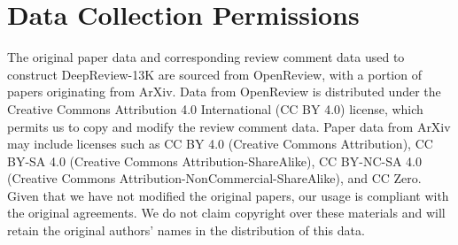 \documentclass{article}
\begin{document}


\section{Data Collection Permissions}
\label{appendix:pipline}
The original paper data and corresponding review comment data used to construct DeepReview-13K are sourced from OpenReview, with a portion of papers originating from ArXiv. Data from OpenReview is distributed under the Creative Commons Attribution 4.0 International (CC BY 4.0) license, which permits us to copy and modify the review comment data. Paper data from ArXiv may include licenses such as CC BY 4.0 (Creative Commons Attribution), CC BY-SA 4.0 (Creative Commons Attribution-ShareAlike), CC BY-NC-SA 4.0 (Creative Commons Attribution-NonCommercial-ShareAlike), and CC Zero. Given that we have not modified the original papers, our usage is compliant with the original agreements. We do not claim copyright over these materials and will retain the original authors' names in the distribution of this data.
\end{document}
